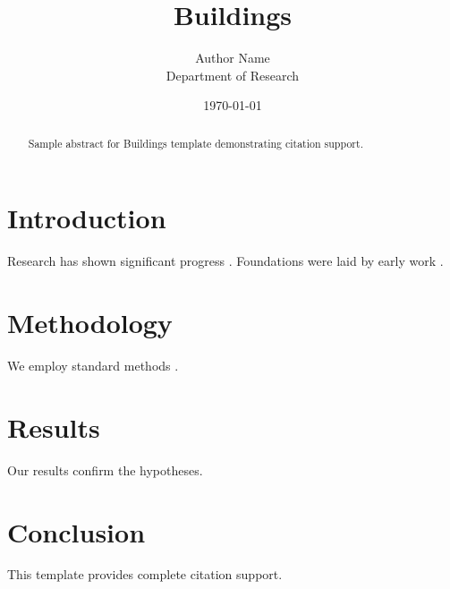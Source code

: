 \documentclass{mdpi}
\title{Buildings}
\author{Author Name \\ \small Department of Research}
\date{\today}
\begin{document}
\maketitle

\begin{abstract}
Sample abstract for Buildings template demonstrating citation support.
\end{abstract}

\section{Introduction}
Research has shown significant progress \citep{einstein1905}. Foundations were laid by early work \citep{turing1950}.

\section{Methodology}
We employ standard methods \citep{knuth1984}.

\section{Results}
Our results confirm the hypotheses.

\section{Conclusion}
This template provides complete citation support.



\end{document}

